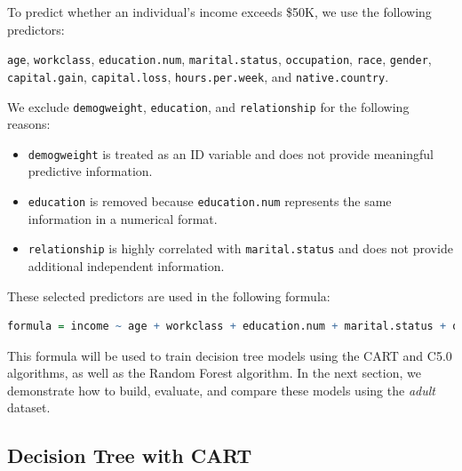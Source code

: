 \documentclass[
  11pt,
]{book}
\newcommand{\passthrough}[1]{#1}
\providecommand{\tightlist}{%
  \setlength{\itemsep}{0pt}\setlength{\parskip}{0pt}}
\theoremstyle{definition}
\theoremstyle{definition}
\theoremstyle{definition}
\theoremstyle{definition}
\theoremstyle{remark}
\begin{document}
To predict whether an individual's income exceeds \$50K, we use the following predictors:

\passthrough{\lstinline!age!}, \passthrough{\lstinline!workclass!}, \passthrough{\lstinline!education.num!}, \passthrough{\lstinline!marital.status!}, \passthrough{\lstinline!occupation!}, \passthrough{\lstinline!race!}, \passthrough{\lstinline!gender!}, \passthrough{\lstinline!capital.gain!}, \passthrough{\lstinline!capital.loss!}, \passthrough{\lstinline!hours.per.week!}, and \passthrough{\lstinline!native.country!}.

We exclude \passthrough{\lstinline!demogweight!}, \passthrough{\lstinline!education!}, and \passthrough{\lstinline!relationship!} for the following reasons:

\begin{itemize}
\tightlist
\item
  \passthrough{\lstinline!demogweight!} is treated as an ID variable and does not provide meaningful predictive information.\\
\item
  \passthrough{\lstinline!education!} is removed because \passthrough{\lstinline!education.num!} represents the same information in a numerical format.\\
\item
  \passthrough{\lstinline!relationship!} is highly correlated with \passthrough{\lstinline!marital.status!} and does not provide additional independent information.
\end{itemize}

These selected predictors are used in the following formula:

\begin{lstlisting}[language=R]
formula = income ~ age + workclass + education.num + marital.status + occupation + race + gender + capital.gain + capital.loss + hours.per.week + native.country
\end{lstlisting}

This formula will be used to train decision tree models using the CART and C5.0 algorithms, as well as the Random Forest algorithm. In the next section, we demonstrate how to build, evaluate, and compare these models using the \emph{adult} dataset.

\subsection*{Decision Tree with CART}\label{decision-tree-with-cart}
\end{document}
